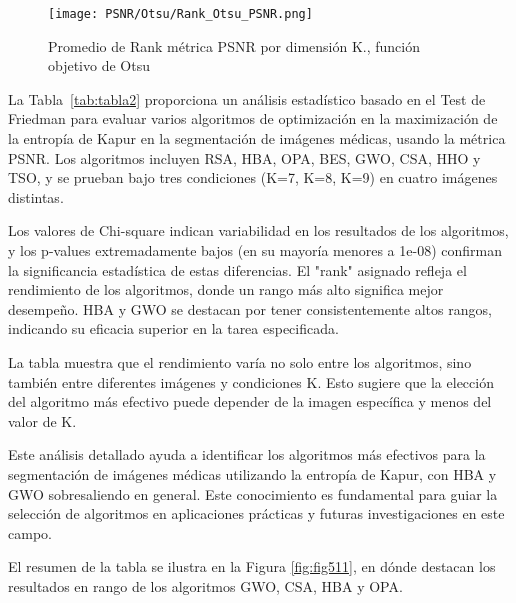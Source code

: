 \documentclass[conference]{IEEEtran}
\begin{document}
\begin{figure}[htbp]
	\centering
	\texttt{[image: PSNR/Otsu/Rank\_Otsu\_PSNR.png]}
	\caption{Promedio de Rank métrica PSNR por dimensión K., función objetivo de Otsu}
\end{figure}



\noindent La Tabla~\ref{tab:tabla2} proporciona un análisis estadístico basado en el Test de Friedman para evaluar varios algoritmos de optimización en la maximización de la entropía de Kapur en la segmentación de imágenes médicas, usando la métrica PSNR. Los algoritmos incluyen RSA, HBA, OPA, BES, GWO, CSA, HHO y TSO, y se prueban bajo tres condiciones (K=7, K=8, K=9) en cuatro imágenes distintas.

\noindent Los valores de Chi-square indican variabilidad en los resultados de los algoritmos, y los p-values extremadamente bajos (en su mayoría menores a 1e-08) confirman la significancia estadística de estas diferencias. El "rank" asignado refleja el rendimiento de los algoritmos, donde un rango más alto significa mejor desempeño. HBA y GWO se destacan por tener consistentemente altos rangos, indicando su eficacia superior en la tarea especificada.

\noindent La tabla muestra que el rendimiento varía no solo entre los algoritmos, sino también entre diferentes imágenes y condiciones K. Esto sugiere que la elección del algoritmo más efectivo puede depender de la imagen específica y menos del valor de K.

\noindent Este análisis detallado ayuda a identificar los algoritmos más efectivos para la segmentación de imágenes médicas utilizando la entropía de Kapur, con HBA y GWO sobresaliendo en general. Este conocimiento es fundamental para guiar la selección de algoritmos en aplicaciones prácticas y futuras investigaciones en este campo.

\noindent El resumen de la tabla se ilustra en la Figura \ref{fig:fig511}, en dónde destacan los resultados en rango de los algoritmos GWO, CSA, HBA y OPA.
\end{document}
